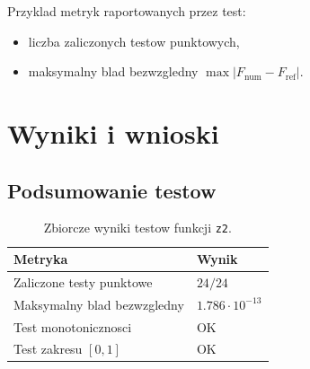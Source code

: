 \documentclass[12pt,a4paper]{article}
\begin{document}
Przyklad metryk raportowanych przez test:
\begin{itemize}
  \item liczba zaliczonych testow punktowych,
  \item maksymalny blad bezwzgledny
  $\max |F_{\text{num}} - F_{\text{ref}}|$.
\end{itemize}

\section{Wyniki i wnioski}
\subsection*{Podsumowanie testow}
\begin{table}[h!]
  \centering
  \begin{tabular}{ll}
    \toprule
    Metryka & Wynik \\
    \midrule
    Zaliczone testy punktowe & $24/24$ \\
    Maksymalny blad bezwzgledny & $1.786 \cdot 10^{-13}$ \\
    Test monotonicznosci & OK \\
    Test zakresu $[0,1]$ & OK \\
    \bottomrule
  \end{tabular}
  \caption{Zbiorcze wyniki testow funkcji \texttt{z2}.}
\end{table}

\end{document}
